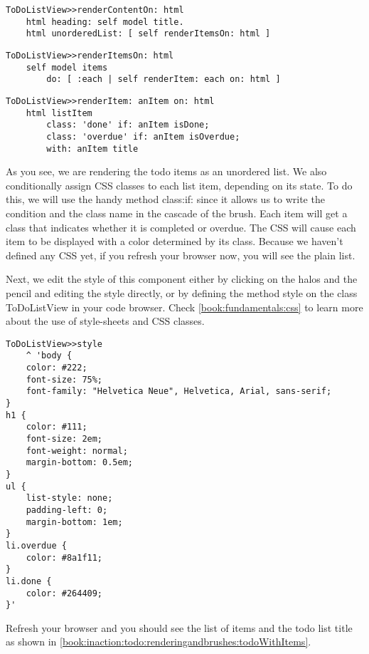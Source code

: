 \documentclass[a4paper,10pt,twoside]{book}
\newcommand{\ct}[1]{{\small\ttfamily\textup{#1}}}
\begin{document}
\begin{lstlisting}
ToDoListView>>renderContentOn: html
    html heading: self model title.
    html unorderedList: [ self renderItemsOn: html ]
\end{lstlisting}

\begin{lstlisting}
ToDoListView>>renderItemsOn: html
    self model items
        do: [ :each | self renderItem: each on: html ]
\end{lstlisting}

\begin{lstlisting}
ToDoListView>>renderItem: anItem on: html
    html listItem
        class: 'done' if: anItem isDone;
        class: 'overdue' if: anItem isOverdue;
        with: anItem title
\end{lstlisting}

As you see, we are rendering the todo items as an unordered list. We also conditionally assign CSS classes to each list item, depending on its state. To do this, we will use the handy method \ct{class:if:} since it allows us to write the condition and the class name in the cascade of the brush. Each item will get a class that indicates whether it is completed or overdue. The CSS will cause each item to be displayed with a color determined by its class. Because we haven't defined any CSS yet, if you refresh your browser now, you will see the plain list. 

Next, we edit the style of this component either by clicking on the halos and the pencil and editing the style directly, or by defining the method \ct{style} on the class \ct{ToDoListView} in your code browser. Check \autoref{book:fundamentals:css} to learn more about the use of style-sheets and CSS classes.

\begin{lstlisting}
ToDoListView>>style
    ^ 'body {
    color: #222;
    font-size: 75%;
    font-family: "Helvetica Neue", Helvetica, Arial, sans-serif;
}
h1 {
    color: #111;
    font-size: 2em;
    font-weight: normal;
    margin-bottom: 0.5em;
}
ul {
    list-style: none;
    padding-left: 0;
    margin-bottom: 1em;
}
li.overdue {
    color: #8a1f11;
}
li.done {
    color: #264409;
}'
\end{lstlisting}

Refresh your browser and you should see the list of items and the todo list title as shown in \autoref{book:inaction:todo:renderingandbrushes:todoWithItems}.
\end{document}
